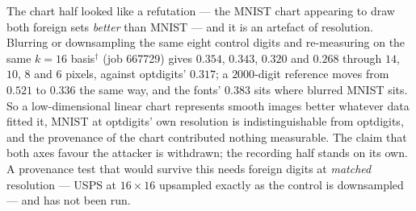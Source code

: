 The chart half looked like a refutation — the MNIST chart appearing to draw
both foreign sets \emph{better} than MNIST — and it is an artefact of
resolution. Blurring or downsampling the same eight control digits and
re-measuring on the same $k=16$ basis$^\dagger$ (job 667729) gives
$0.354$, $0.343$, $\mathbf{0.320}$ and $0.268$ through $14$, $10$, $8$ and
$6$ pixels, against optdigits' $0.317$; a $2000$-digit reference moves from
$0.521$ to $0.336$ the same way, and the fonts' $0.383$ sits where blurred
MNIST sits. So a low-dimensional linear chart represents smooth images
better whatever data fitted it, MNIST at optdigits' own resolution is
indistinguishable from optdigits, and the provenance of the chart contributed
nothing measurable. The claim that both axes favour the attacker is
withdrawn; the recording half stands on its own. A provenance test that would
survive this needs foreign digits at \emph{matched} resolution — USPS at
$16\times16$ upsampled exactly as the control is downsampled — and has not
been run.

